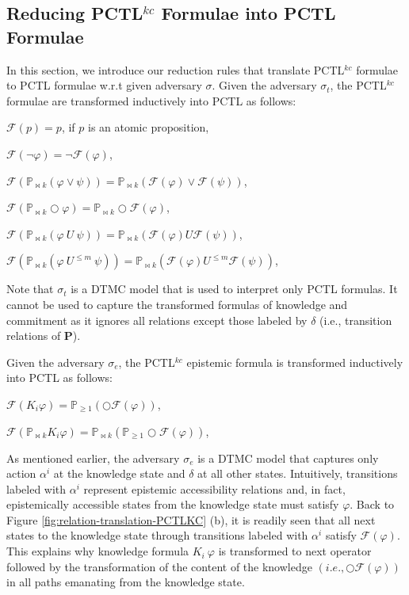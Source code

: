 \subsection{Reducing PCTL$^{kc}$ Formulae into PCTL Formulae}

In this section, we introduce our reduction rules that translate PCTL$^{kc}$ formulae to PCTL formulae w.r.t given adversary $\sigma$. Given the adversary $\sigma_t$, the PCTL$^{kc}$ formulae are transformed
inductively into PCTL as follows:

$\mathscr{F}(p)=p$, if $p$ is an atomic proposition,

$\mathscr{F}(\neg \varphi)= \neg \mathscr{F} (\varphi)$,

$\mathscr{F}(\mathbb{P}_{\bowtie k}(\varphi \vee \psi))=\mathbb{P}_{\bowtie k}(\mathscr{F}(\varphi) \vee \mathscr{F}(\psi))$,

$\mathscr{F}(\mathbb{P}_{\bowtie k}\bigcirc \varphi)=\mathbb{P}_{\bowtie k} \bigcirc \mathscr{F}(\varphi)$,

$\mathscr{F}(\mathbb{P}_{\bowtie k}(\varphi~ U ~ \psi))=\mathbb{P}_{\bowtie k} (\mathscr{F}(\varphi) U \mathscr{F}(\psi))$,

$\mathscr{F}(\mathbb{P}_{\bowtie k}(\varphi~ U^{\leq m} ~ \psi))=\mathbb{P}_{\bowtie k} (\mathscr{F}(\varphi) U^{\leq m} \mathscr{F}(\psi))$,

Note that $\sigma_t$ is a DTMC model that is used to interpret only PCTL formulas. It cannot be used to capture the transformed formulas of knowledge and commitment as it ignores all relations except those labeled by $\delta$ (i.e., transition relations of $\textbf{P}$).

Given the adversary $\sigma_e$, the PCTL$^{kc}$ epistemic formula is transformed inductively into PCTL as follows:

$\mathscr{F}(K_i \varphi)= \mathbb{P}_{\geq 1}(\bigcirc \mathscr{F}(\varphi))$,

$\mathscr{F}(\mathbb{P}_{\bowtie k} K_i \varphi)= \mathbb{P}_{\bowtie k}(\mathbb{P}_{\geq 1}\bigcirc\mathscr{F}(\varphi))$,


As mentioned earlier, the adversary $\sigma_e$ is a DTMC model that captures only action $\alpha^i$ at the knowledge state and $\delta$ at all other states. Intuitively, transitions labeled with $\alpha^i$ represent epistemic accessibility relations and, in fact, epistemically accessible states from the knowledge state must satisfy $\varphi$. Back to Figure \ref{fig:relation-translation-PCTLKC} (b), it is readily seen that all next states to the knowledge state through transitions labeled with $\alpha^i$ satisfy $\mathscr{F}(\varphi)$. This explains why knowledge formula $K_i~\varphi$ is transformed to next operator followed by the transformation of the content of the knowledge $(i.e., \bigcirc \mathscr{F}(\varphi))$ in all paths emanating from the knowledge state.

